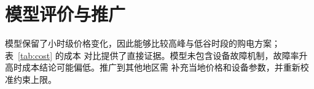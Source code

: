 \section{模型评价与推广}
模型保留了小时级价格变化，因此能够比较高峰与低谷时段的购电方案；表~\ref{tab:cost} 的成本
对比提供了直接证据。模型未包含设备故障机制，故障率升高时成本结论可能偏低。推广到其他地区需
补充当地价格和设备参数，并重新校准约束上限。

